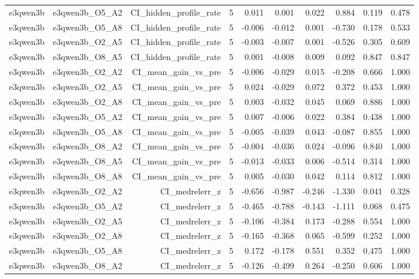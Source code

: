 \documentclass[11pt]{article}
\begin{document}
\begin{landscape}
\begin{longtable}{@{}lrrrrrrrrr@{}}
e3qwen3b & e3qwen3b\_O5\_A2 & CI\_hidden\_profile\_rate & 5 & 0.011 & 0.001 & 0.022 & 0.884 & 0.119 & 0.478 \\
e3qwen3b & e3qwen3b\_O5\_A8 & CI\_hidden\_profile\_rate & 5 & -0.006 & -0.012 & 0.001 & -0.730 & 0.178 & 0.533 \\
e3qwen3b & e3qwen3b\_O2\_A5 & CI\_hidden\_profile\_rate & 5 & -0.003 & -0.007 & 0.001 & -0.526 & 0.305 & 0.609 \\
e3qwen3b & e3qwen3b\_O8\_A5 & CI\_hidden\_profile\_rate & 5 & 0.001 & -0.008 & 0.009 & 0.092 & 0.847 & 0.847 \\
e3qwen3b & e3qwen3b\_O2\_A2 & CI\_mean\_gain\_vs\_pre & 5 & -0.006 & -0.029 & 0.015 & -0.208 & 0.666 & 1.000 \\
e3qwen3b & e3qwen3b\_O2\_A5 & CI\_mean\_gain\_vs\_pre & 5 & 0.024 & -0.029 & 0.072 & 0.372 & 0.453 & 1.000 \\
e3qwen3b & e3qwen3b\_O2\_A8 & CI\_mean\_gain\_vs\_pre & 5 & 0.003 & -0.032 & 0.045 & 0.069 & 0.886 & 1.000 \\
e3qwen3b & e3qwen3b\_O5\_A2 & CI\_mean\_gain\_vs\_pre & 5 & 0.007 & -0.006 & 0.022 & 0.384 & 0.438 & 1.000 \\
e3qwen3b & e3qwen3b\_O5\_A8 & CI\_mean\_gain\_vs\_pre & 5 & -0.005 & -0.039 & 0.043 & -0.087 & 0.855 & 1.000 \\
e3qwen3b & e3qwen3b\_O8\_A2 & CI\_mean\_gain\_vs\_pre & 5 & -0.004 & -0.036 & 0.024 & -0.096 & 0.840 & 1.000 \\
e3qwen3b & e3qwen3b\_O8\_A5 & CI\_mean\_gain\_vs\_pre & 5 & -0.013 & -0.033 & 0.006 & -0.514 & 0.314 & 1.000 \\
e3qwen3b & e3qwen3b\_O8\_A8 & CI\_mean\_gain\_vs\_pre & 5 & 0.005 & -0.030 & 0.042 & 0.114 & 0.812 & 1.000 \\
e3qwen3b & e3qwen3b\_O2\_A2 & CI\_medrelerr\_z & 5 & -0.656 & -0.987 & -0.246 & -1.330 & 0.041 & 0.328 \\
e3qwen3b & e3qwen3b\_O5\_A2 & CI\_medrelerr\_z & 5 & -0.465 & -0.788 & -0.143 & -1.111 & 0.068 & 0.475 \\
e3qwen3b & e3qwen3b\_O2\_A5 & CI\_medrelerr\_z & 5 & -0.106 & -0.384 & 0.173 & -0.288 & 0.554 & 1.000 \\
e3qwen3b & e3qwen3b\_O2\_A8 & CI\_medrelerr\_z & 5 & -0.165 & -0.368 & 0.065 & -0.599 & 0.252 & 1.000 \\
e3qwen3b & e3qwen3b\_O5\_A8 & CI\_medrelerr\_z & 5 & 0.172 & -0.178 & 0.551 & 0.352 & 0.475 & 1.000 \\
e3qwen3b & e3qwen3b\_O8\_A2 & CI\_medrelerr\_z & 5 & -0.126 & -0.499 & 0.264 & -0.250 & 0.606 & 1.000 \\

\end{longtable}
\end{landscape}
\end{document}

